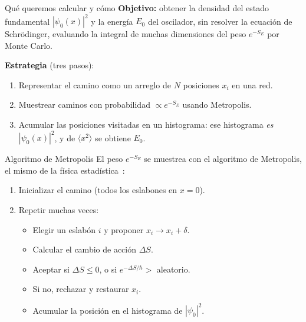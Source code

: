\documentclass[aspectratio=169, 11pt]{beamer}
\begin{document}
\begin{frame}{Qué queremos calcular y cómo}
  \small
  \textbf{Objetivo:} obtener la densidad del estado fundamental $|\psi_0(x)|^2$ y la
  energía $E_0$ del oscilador, sin resolver la ecuación de Schrödinger, evaluando la
  integral de muchas dimensiones del peso $e^{-S_E}$ por Monte Carlo.

  \vspace{0.25cm}
  \textbf{Estrategia} (tres pasos):
  \begin{enumerate}\setlength\itemsep{3pt}
    \item Representar el camino como un arreglo de $N$ posiciones $x_i$ en una red.
    \item Muestrear caminos con probabilidad $\propto e^{-S_E}$ usando Metropolis.
    \item Acumular las posiciones visitadas en un histograma: ese histograma
          \emph{es} $|\psi_0(x)|^2$, y de $\langle x^2\rangle$ se obtiene $E_0$.
  \end{enumerate}
\end{frame}

\begin{frame}{Algoritmo de Metropolis}
  \small
  El peso $e^{-S_E}$ se muestrea con el algoritmo de Metropolis, el mismo de la
  física estadística~\parencite{metropolis_1953, creutz_freedman_1981}:

  \vspace{0.15cm}
  \begin{enumerate}\setlength\itemsep{2pt}
    \item Inicializar el camino (todos los eslabones en $x = 0$).
    \item Repetir muchas veces:
      \begin{itemize}\setlength\itemsep{1pt}
        \item Elegir un eslabón $i$ y proponer $x_i \to x_i + \delta$.
        \item Calcular el cambio de acción $\Delta S$.
        \item Aceptar si $\Delta S \leq 0$, o si $e^{-\Delta S/\hbar} >$ aleatorio.
        \item Si no, rechazar y restaurar $x_i$.
        \item Acumular la posición en el histograma de $|\psi_0|^2$.
      \end{itemize}
  \end{enumerate}
\end{frame}
\end{document}
